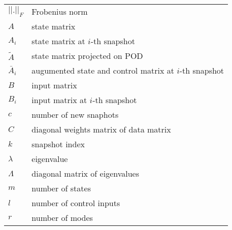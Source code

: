 \begin{table}[H]
	\begin{tabular}{p{2cm}l}
		\(|| . ||_F\)                  & Frobenius norm                                                    \\
		\(A\)                          & state matrix                                                      \\
		\(A_i\)                        & state matrix at \(i\)-th snapshot                                 \\
		\(\tilde{A}\)                  & state matrix projected on POD                                     \\
		\(\bar{A}_i\)                  & augumented state and control matrix at \(i\)-th snapshot          \\
		\(B\)                          & input matrix                                                      \\
		\(B_i\)                        & input matrix at \(i\)-th snapshot                                 \\
		\(c\)                          & number of new snaphots                                            \\
		\(C\)                          & diagonal weights matrix of data matrix                            \\
		\(k\)                          & snapshot index                                                    \\
		\(\lambda \)                   & eigenvalue                                                        \\
		\(\Lambda \)                   & diagonal matrix of eigenvalues                                    \\
		\(m\)                          & number of states                                                  \\
		\(l\)                          & number of control inputs                                          \\
		\(r\)                          & number of modes                                                   \\

\end{tabular}
\end{table}

